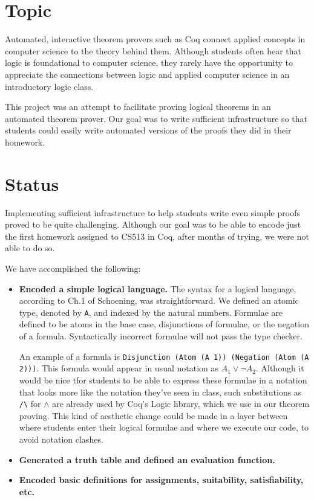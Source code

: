 \documentclass{article}
\begin{document}
\section{Topic}
Automated, interactive theorem provers such as Coq connect applied concepts in computer science to the theory behind them. Although students often hear that logic is foundational to computer science, they rarely have the opportunity to appreciate the connections between logic and applied computer science in an introductory logic class. 

This project was an attempt to facilitate proving logical theorems in an automated theorem prover. Our goal was to write sufficient infrastructure so that students could easily write automated versions of the proofs they did in their homework. 
\section{Status}
Implementing sufficient infrastructure to help students write even simple proofs proved to be quite challenging. Although our goal was to be able to encode just the first homework assigned to CS513 in Coq, after months of trying, we were not able to do so.

We have accomplished the following:
\begin{itemize}
\item {\bf Encoded a simple logical language.} The syntax for a logical language, according to Ch.1 of Schoening, was straightforward. We defined an atomic type, denoted by \verb|A|, and indexed by the natural numbers. Formulae are defined to be atoms in the base case, disjunctions of formulae, or the negation of a formula. Syntactically incorrect formulae will not pass the type checker. 

An example of a formula is \verb|Disjunction (Atom (A 1)) (Negation (Atom (A 2)))|. This formula would appear in usual notation as $A_1 \vee \neg A_2$. Although it would be nice tfor students to be able to express these formulae in a notation that looks more like the notation they've seen in class, such substitutions as \verb|/\| for $\wedge$ are already used by Coq's Logic library, which we use in our theorem proving. This kind of aesthetic change could be made in a layer between where students enter their logical formulae and where we execute our code, to avoid notation clashes.

\item {\bf Generated a truth table and defined an evaluation function.} 
\item {\bf Encoded basic definitions for assignments, suitability, satisfiability, etc.}  
\end{itemize}
\end{document}
